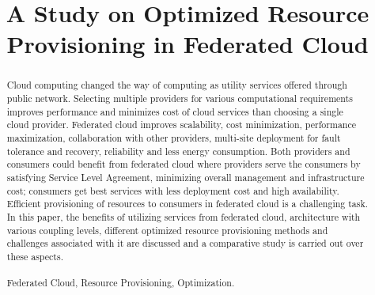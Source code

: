 \documentclass[conference]{IEEEtran}
\begin{document}
\title{A Study on Optimized Resource Provisioning in Federated Cloud}
\author{
 }











\maketitle


\begin{abstract}
Cloud computing changed the way of computing as utility services offered through public network. Selecting multiple providers for various computational requirements improves performance and minimizes cost of cloud services than choosing a single cloud provider. Federated cloud improves scalability, cost minimization, performance maximization, collaboration with other providers, multi-site deployment for fault tolerance and recovery, reliability and less energy consumption. Both providers and consumers could benefit from federated cloud where providers serve the consumers by satisfying Service Level Agreement, minimizing overall management and infrastructure cost; consumers get best services with less deployment cost and high availability. Efficient provisioning of resources to consumers in federated cloud is a challenging task. In this paper, the benefits of utilizing services from federated cloud, architecture with various coupling levels, different optimized resource provisioning methods and challenges associated with it are discussed and a comparative study is carried out over these aspects.\\
\\
\keywords Federated Cloud, Resource Provisioning, Optimization. 
\end{abstract}







\IEEEpeerreviewmaketitle
\end{document}
